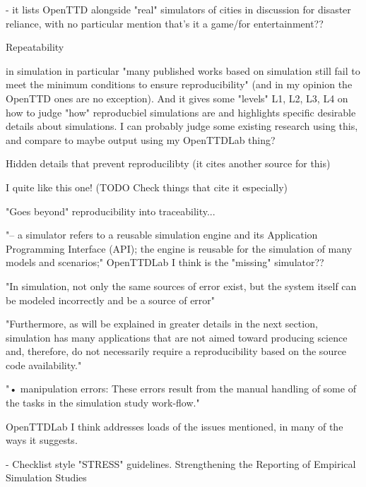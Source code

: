 \documentclass[logo,msc]{infthesis}           %
\begin{document}
\begin{itemize}
\begin{item}
\cite{cimellaro2016computational} - it lists OpenTTD alongside "real" simulators of cities in discussion for disaster reliance, with no particular mention that's it a game/for entertainment??
\end{item}

Repeatability


\begin{itemize}
\begin{item}
\cite{dalle2012reproducibility} in simulation in particular "many published works based on simulation still fail to meet the minimum conditions to ensure reproducibility" (and in my opinion the OpenTTD ones are no exception). And it gives some "levels" L1, L2, L3, L4 on how to judge "how" reproducbiel simulations are and highlights specific desirable details about simulations. I can probably judge some existing research using this, and compare to maybe output using my OpenTTDLab thing?

Hidden details that prevent reproducilibty (it cites another source for this)

I quite like this one! (TODO Check things that cite it especially)

"Goes beyond" reproducibility into traceability...

"– a simulator refers to a reusable simulation engine and its Application Programming Interface
(API); the engine is reusable for the simulation of many models and scenarios;" OpenTTDLab I think is the "missing" simulator??

"In simulation, not only the same sources of error
exist, but the system itself can be modeled incorrectly and be a source of error"

"Furthermore, as will be explained in greater details
in the next section, simulation has many applications that are not aimed toward producing science
and, therefore, do not necessarily require a reproducibility based on the source code availability."

"• manipulation errors: These errors result from the manual handling of some of the tasks in the simulation study work-flow."

OpenTTDLab I think addresses loads of the issues mentioned, in many of the ways it suggests.
\end{item}


\begin{item}
\cite{monks2019strengthening} - Checklist style "STRESS" guidelines. Strengthening the Reporting of Empirical Simulation Studies


\end{item}
\end{itemize}
\end{itemize}
\end{document}
